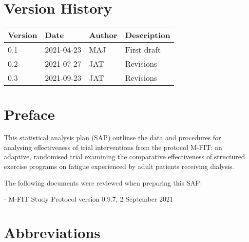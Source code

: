 \documentclass[
]{article}
\title{\currentTitle}
\subtitle{}
\author{}
\date{\vspace{-2.5em}\currentVersion}
\begin{document}
\maketitle

{
  \setcounter{tocdepth}{2}
  \tableofcontents
}

\hypertarget{version-history}{%
  \section*{Version History}\label{version-history}}

\begin{table}[H]
  \renewcommand{\arraystretch}{1.5}
  \begin{center}
    \begin{tabular}{lllp{5cm}}
      \hline
      Version & Date       & Author & Description   \\ \hline
      0.1     & 2021-04-23 & MAJ    & First draft   \\
      0.2     & 2021-07-27 & JAT    & Revisions \\
      0.3     & 2021-09-23 & JAT    & Revisions \\
      \hline
    \end{tabular}
  \end{center}
\end{table}

\clearpage

\hypertarget{preface}{%
  \section*{Preface}\label{Preface}}

This statistical analysis plan (SAP) outlinse the data and procedures for analysing effectiveness of trial interventions from the protocol M-FIT: an adaptive, randomised trial examining the comparative effectiveness of structured exercise programs on fatigue experienced by adult patients receiving dialysis.

The following documents were reviewed when preparing this SAP:

- M-FIT Study Protocol version 0.9.7, 2 September 2021

\clearpage

\hypertarget{abbreviations}{%
  \section*{Abbreviations}\label{abbreviations}}
\end{document}
